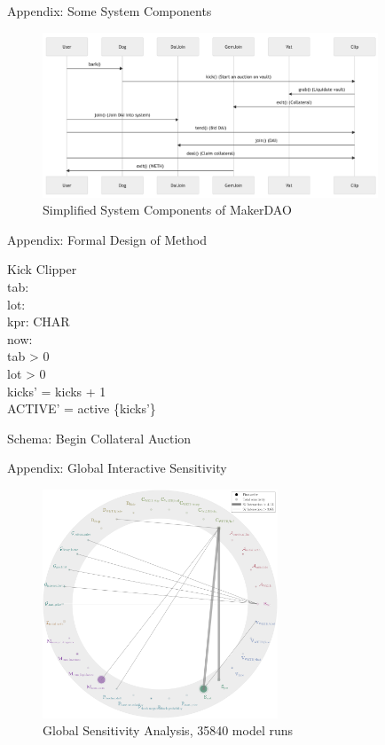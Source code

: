 \documentclass{beamer}
\begin{document}
\begin{frame}{Appendix: Some System Components}
\begin{figure}
\centering
\includegraphics[width=100mm]{resources/system.png}
\caption{Simplified System Components of MakerDAO}
\label{fig2}
\end{figure}
\end{frame}

\begin{frame}{Appendix: Formal Design of Method}
\begin{schema}{Kick}
\Delta Clipper \\
tab: \real \\
lot: \real \\
kpr: \seq CHAR \\
now: \nat \\
\where
tab > 0 \\
lot > 0 \\
kicks' = kicks + 1 \\
ACTIVE' = active \cup \{kicks'\} \\
\end{schema}

\centering
\normalsize{Schema: Begin Collateral Auction}
\vfill  %
\end{frame}


\begin{frame}{Appendix: Global Interactive Sensitivity}
\begin{figure}
\centering
\includegraphics[width=70mm]{Figs/Sobol' Sensitivity Analysis, 35840 model runs.pdf}
\caption{Global Sensitivity Analysis, 35840 model runs}
\label{fig3}
\end{figure}
\end{frame}
\end{document}
